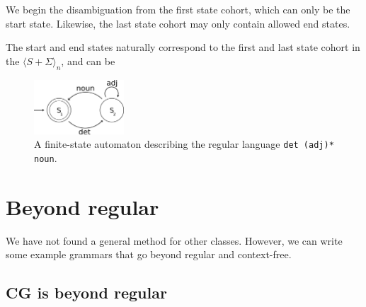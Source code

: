 \documentclass[11pt]{article}
\def\t#1{\texttt{#1}}
\begin{document}
We begin the disambiguation from the first state cohort, which can only be
the start state. Likewise, the last state cohort may only contain allowed end states.


The start and end states naturally
correspond to the first and last state cohort in the  $\langle S+\Sigma \rangle_n$,
and can be 






\begin{figure}[t]
  \centering
    \includegraphics[width=0.3\textwidth]{fsa.png}
  \caption{A finite-state automaton describing the regular language \t{det (adj)* noun}.}
 \label{fig:fsa}
\end{figure}


\section{Beyond regular}

We have not found a general method for other classes. 
However, we can write some example grammars that go beyond regular and context-free.

\subsection{CG is beyond regular}
\end{document}
